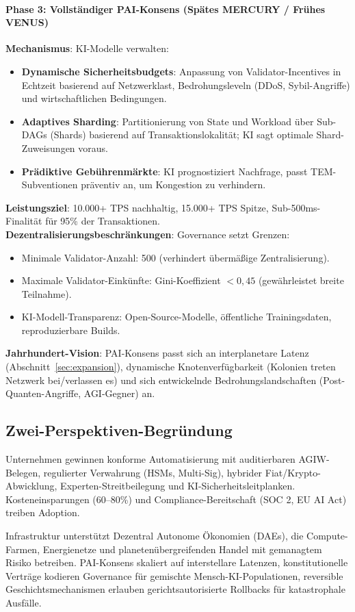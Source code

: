 \documentclass[11pt]{article}
\begin{document}
\paragraph{Phase 3: Vollständiger PAI-Konsens (Spätes MERCURY / Frühes VENUS)}
\textbf{Mechanismus}: KI-Modelle verwalten:
\begin{itemize}[noitemsep]
  \item \textbf{Dynamische Sicherheitsbudgets}: Anpassung von Validator-Incentives in Echtzeit basierend auf Netzwerklast, Bedrohungsleveln (DDoS, Sybil-Angriffe) und wirtschaftlichen Bedingungen.
  \item \textbf{Adaptives Sharding}: Partitionierung von State und Workload über Sub-DAGs (Shards) basierend auf Transaktionslokalität; KI sagt optimale Shard-Zuweisungen voraus.
  \item \textbf{Prädiktive Gebührenmärkte}: KI prognostiziert Nachfrage, passt TEM-Subventionen präventiv an, um Kongestion zu verhindern.
\end{itemize}
\textbf{Leistungsziel}: 10.000+ TPS nachhaltig, 15.000+ TPS Spitze, Sub-500ms-Finalität für 95\% der Transaktionen.\\
\textbf{Dezentralisierungsbeschränkungen}: Governance setzt Grenzen:
\begin{itemize}[noitemsep]
  \item Minimale Validator-Anzahl: 500 (verhindert übermäßige Zentralisierung).
  \item Maximale Validator-Einkünfte: Gini-Koeffizient $<0,45$ (gewährleistet breite Teilnahme).
  \item KI-Modell-Transparenz: Open-Source-Modelle, öffentliche Trainingsdaten, reproduzierbare Builds.
\end{itemize}
\textbf{Jahrhundert-Vision}: PAI-Konsens passt sich an interplanetare Latenz (Abschnitt~\ref{sec:expansion}), dynamische Knotenverfügbarkeit (Kolonien treten Netzwerk bei/verlassen es) und sich entwickelnde Bedrohungslandschaften (Post-Quanten-Angriffe, AGI-Gegner) an.

\subsection{Zwei-Perspektiven-Begründung}
\begin{description}[style=nextline]
  \item[Kurzfristig (MERCURY-Ära)] Unternehmen gewinnen konforme Automatisierung mit auditierbaren AGIW-Belegen, regulierter Verwahrung (HSMs, Multi-Sig), hybrider Fiat/Krypto-Abwicklung, Experten-Streitbeilegung und KI-Sicherheitsleitplanken. Kosteneinsparungen (60--80\%) und Compliance-Bereitschaft (SOC 2, EU AI Act) treiben Adoption.
  \item[Jahrhundert-Skala (VENUS bis ANDROMEDA)] Infrastruktur unterstützt Dezentral Autonome Ökonomien (DAEs), die Compute-Farmen, Energienetze und planetenübergreifenden Handel mit gemanagtem Risiko betreiben. PAI-Konsens skaliert auf interstellare Latenzen, konstitutionelle Verträge kodieren Governance für gemischte Mensch-KI-Populationen, reversible Geschichtsmechanismen erlauben gerichtsautorisierte Rollbacks für katastrophale Ausfälle.
\end{description}
\end{document}
